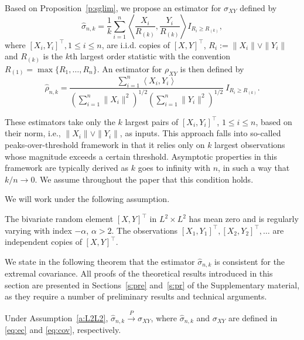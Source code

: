 \documentclass[lineno]{biometrika}
\newcommand \ag{\alpha}
\newcommand \sg{\sigma}
\newcommand\lip{\left \langle}
\newcommand\rip{\right \rangle}
\def\convP{\stackrel{\mbox{$\scriptstyle P$}}{\rightarrow}}
\begin{document}
Based on Proposition~\ref{p:sglim}, we propose an estimator for $\sg_{XY}$ defined by
\begin{equation} \label{eq:ec}
\hat{\sg}_{n,k} =\frac{1}{k}\sum_{i=1}^n \lip \frac{X_i}{R_{(k)}}, \frac{Y_i}{R_{(k)}} \rip I_{R_i \ge R_{(k)} },
\end{equation}
where $[X_i, Y_i]^{\top}, 1 \le i \le n$, are i.i.d. copies of $[X,Y]^{\top}$,   $R_i:=\|X_i\| \vee \|Y_i\|$ and $R_{(k)}$ is the $k$th largest order statistic with the convention $R_{(1)} = \max \{ R_1, \ldots, R_n \}$. An estimator for $\rho_{XY}$ is then defined by
\begin{equation} \label{eq:ecc}
\hat{\rho}_{n,k} = \frac{\sum_{i=1}^n \lip X_i, Y_i \rip}{(\sum_{i=1}^n \|X_i\|^2)^{1/2} (\sum_{i=1}^n \|Y_i\|^2)^{1/2}} \ I_{R_i \ge R_{(k)} }.
\end{equation}


These estimators take only the $k$ largest pairs of $[X_i, Y_i]^{\top}$, $1\le i\le n$, based on their norm, i.e., $\|X_i\| \vee \|Y_i\|$, as inputs. This approach falls into so-called peaks-over-threshold framework in that it relies only on $k$ largest observations whose magnitude exceeds a certain threshold. Asymptotic properties in this framework are typically derived as $k$ goes to infinity with $n$, in such a way that $k/n \to 0$. We assume throughout the paper that this condition holds.

We will work under the following assumption.

\begin{assumption} \label{a:L2L2}
The bivariate random element $[X,Y]^{\top}$ in  $L^2 \times L^2$ has mean zero and is regularly varying with index $-\ag$, $\ag >2$. The observations $[X_1,Y_1]^{\top}, [X_2,Y_2]^{\top}, \ldots$ are independent copies of $[X,Y]^{\top}$.
\end{assumption}



We state in the following theorem that the estimator $\hat{\sg}_{n,k}$ is consistent for the extremal covariance. All proofs of the theoretical results introduced in this section are presented in Sections~\ref{s:pre} and~\ref{s:pr} of the Supplementary material, as they require a number of preliminary  results and technical arguments.


\begin{theorem}\label{t:cs}
Under Assumption~\ref{a:L2L2},
$
\hat{\sg}_{n,k} \convP \sg_{XY}$,
where $\hat{\sg}_{n,k}$ and $\sg_{XY}$ are defined in \eqref{eq:ec} and \eqref{eq:cov}, respectively.
\end{theorem}
\end{document}
